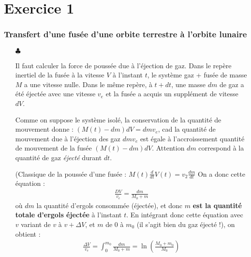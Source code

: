 \documentclass{report}
\begin{document}
\section*{Exercice 1}

\subsubsection*{Transfert d'une fusée d'une orbite terrestre à l'orbite lunaire}

\begin{itemize}

\item[$\clubsuit$] 

Il faut calculer la force de poussée due à l'éjection de gaz. Dans le repère inertiel de la fusée à la vitesse $V$ à l'instant $t$, le système {gaz + fusée} de masse $M$ a une vitesse nulle. Dans le même repère, à $t+dt$, une masse $dm$ de gaz a été éjectée avec une vitesse $v_e$ et la fusée a acquis un supplément de vitesse $dV$.

Comme on suppose le système isolé, la conservation de la quantité de mouvement donne : $(M(t) - dm)dV = dmv_e$, cad la quantité de mouvement due à l'éjection des gaz $dmv_e$ est égale à l'accroissement quantité de mouvement de la fusée $(M(t) - dm)dV$. Attention $dm$ correspond à la quantité de gaz \textit{éjecté} durant $dt$.

\noindent{}

(Classique de la poussée d'une fusée : $M(t)\frac{d}{dt}V(t)=v_2\frac{dm}{dt}$
On a donc cette équation :
\begin{align*}
\frac{DV}{v_e}=\frac{dm}{M_0+m}
\end{align*}
où $dm$ la quantité d'ergols consommée (éjectée), et donc $m$ \textbf{est la quantité totale d'ergols éjectée} à l'instant $t$. En intégrant donc cette équation avec $v$ variant de $v$ à $v+\Delta V$, et $m$ de 0 à $m_0$ (il s'agit bien du gaz éjecté !), on obtient :
\begin{align*}
	\frac{\Delta V}{v_e}=\int_{0}^{m_0}\frac{dm}{M_0+m}=\ln\left(\frac{M_0 + m_0}{M_0} \right) 
\end{align*}

\noindent{}


\end{itemize}
\end{document}
